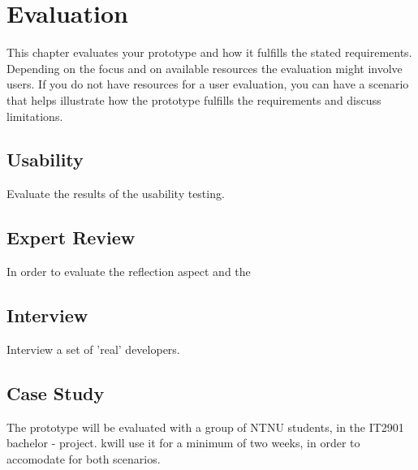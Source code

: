 \chapter{Evaluation}
This chapter evaluates your prototype and how it fulfills the
stated requirements. Depending on the focus and on available resources
the evaluation might involve users. If you do not have resources for a user
evaluation, you can have a scenario that helps illustrate how the prototype
fulfills the requirements and discuss limitations.

\section{Usability}
Evaluate the results of the usability testing.

\section{Expert Review}
In order to evaluate the reflection aspect and the 

\section{Interview}
Interview a set of 'real' developers.

\section{Case Study}
The prototype will be evaluated with a group of NTNU students, in the IT2901 bachelor - project. kwill use it for a minimum of two weeks, in order to accomodate for both scenarios.